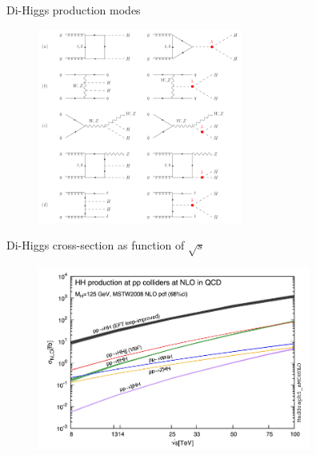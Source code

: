 \begin{frame}{Di-Higgs production modes}
    \begin{figure}
        \centering
        \includegraphics[width=0.6\textwidth]{BackUp/Part1/Img/HH_feyns.png}
        
    \end{figure}
\end{frame}
\begin{frame}{Di-Higgs cross-section as function of $\sqrt{s}$}
\begin{figure}
    \centering
    \includegraphics[width=0.8\textwidth]{BackUp/Part1/Img/HH_XSec_as_S.png}
\end{figure}
\end{frame}
